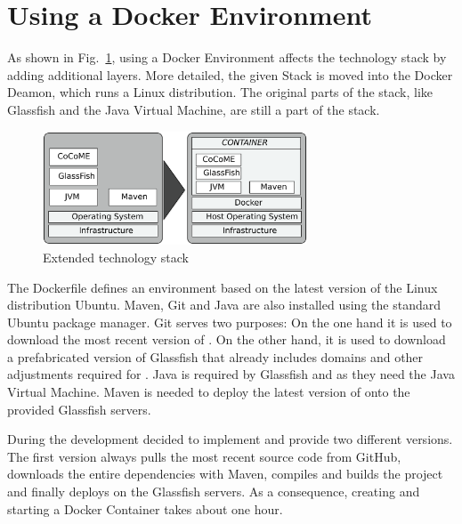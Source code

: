 \newpage

\section{Using a Docker Environment} \label{Docker}

As shown in Fig.~\ref{techStack}, using a Docker Environment affects the technology stack by adding additional layers. More detailed, the given \CoCoME Stack is moved into the Docker Deamon, which runs a Linux distribution. The original parts of the stack, like Glassfish and the Java Virtual Machine, are still a part of the stack.
	
	\begin{figure}[!h]
		\centering
		\includegraphics[width = 0.7\textwidth]{img/tech_stack_CoCoME.pdf}
		\caption{Extended technology stack \CoCoME}
		\label{techStack}
	\end{figure}
\noindent	
The Dockerfile defines an environment based on the latest version of the Linux distribution Ubuntu.
Maven, Git and Java are also installed using the standard Ubuntu package manager. %
Git serves two purposes: On the one hand it is used to download the most recent version of  \CoCoME {}.
On the other hand, it is used to download a prefabricated version of Glassfish that already includes domains and other adjustments required for \CoCoME. 
Java is required by Glassfish and \CoCoME as they need the Java Virtual Machine. 
Maven is needed to  deploy the latest version of \CoCoME onto the provided Glassfish servers.

During the development decided to implement and provide two different versions. 
The first version always pulls the most recent \CoCoME source code from GitHub, downloads the entire dependencies with Maven, compiles and builds the project and finally deploys \CoCoME on the Glassfish servers. 
As a consequence, creating and starting a Docker Container takes about one hour.

